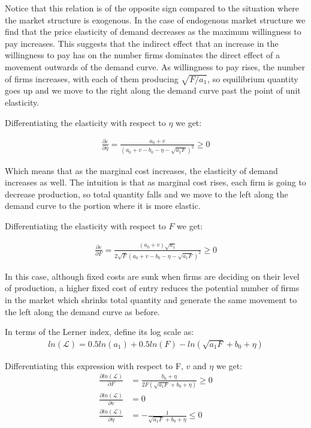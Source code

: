 \documentclass[11pt,english]{article}
\begin{document}
\begin{enumerate}
Notice that this relation is of the opposite sign compared to the situation where the market structure is exogenous. In the case of endogenous market structure we find that the price elasticity of demand decreases as the maximum willingness to pay increases. This suggests that the indirect effect that an increase in the willingness to pay has on the number firms dominates the direct effect of a movement outwards of the demand curve. As willingness to pay rises, the number of firms increases, with each of them producing $\sqrt{F/a_{1}}$, so equilibrium quantity goes up and we move to the right along the demand curve past the point of unit elasticity.


Differentiating the elasticity with respect to $\eta$ we get:

\begin{align}
\frac{\partial \varepsilon}{\partial \eta}=\frac{a_{0}+v}{(a_{0}+v-b_{0}-\eta-\sqrt{a_{1}F})^{2}}\geq0\nonumber
\end{align}

Which means that as the marginal cost increases, the elasticity of demand increases as well. The intuition is that as marginal cost rises, each firm is going to decrease production, so total quantity falls and we move to the left along the demand curve to the portion where it is more elastic.

Differentiating the elasticity with respect to $F$ we get:

\begin{align}
\frac{\partial \varepsilon}{\partial F}=\frac{(a_{0}+v)\sqrt{a_{1}}}{2\sqrt{F}(a_{0}+v-b_{0}-\eta-\sqrt{a_{1}F})^{2}}\geq0\nonumber
\end{align}

In this case, although fixed costs are sunk when firms are deciding on their level of production, a higher fixed cost of entry reduces the potential number of firms in the market which shrinks total quantity and generate the same movement to the left along the demand curve as before.

In terms of the Lerner index, define its log scale as:
\begin{align}
ln(\mathcal{L})=0.5ln(a_{1})+0.5ln(F)-ln(\sqrt{a_{1}F}+b_{0}+\eta)\nonumber
\end{align}

Differentiating this expression with respect to F, $v$ and $\eta$ we get:
\begin{align}
\frac{\partial ln(\mathcal{L})}{\partial F}&=\frac{b_{0}+\eta}{2F(\sqrt{a_{1}F}+b_{0}+\eta)}\geq0\nonumber\\
\frac{\partial ln(\mathcal{L})}{\partial v}&=0\nonumber\\
\frac{\partial ln(\mathcal{L})}{\partial \eta}&=-\frac{1}{\sqrt{a_{1}F}+b_{0}+\eta}\leq0\nonumber
\end{align}


\end{enumerate}
\end{document}
